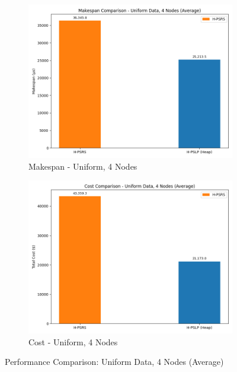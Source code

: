 \documentclass[]{interact}
\theoremstyle{plain}
\theoremstyle{definition}
\theoremstyle{remark}
\begin{document}
\begin{figure}[H]
    \centering
    \begin{subfigure}{0.48\textwidth}
        \includegraphics[width=\textwidth]{src/out_matplotlib_charts/perf_makespan_uniform_4nodes.png}
        \caption{Makespan - Uniform, 4 Nodes}
        \label{fig:m1}
    \end{subfigure}
    \hfill
    \begin{subfigure}{0.48\textwidth}
        \includegraphics[width=\textwidth]{src/out_matplotlib_charts/perf_cost_uniform_4nodes.png}
        \caption{Cost - Uniform, 4 Nodes}
        \label{fig:m2}
    \end{subfigure}
    \caption{Performance Comparison: Uniform Data, 4 Nodes (Average)}
    \label{fig:perf_uniform_4nodes}
\end{figure}
\end{document}
